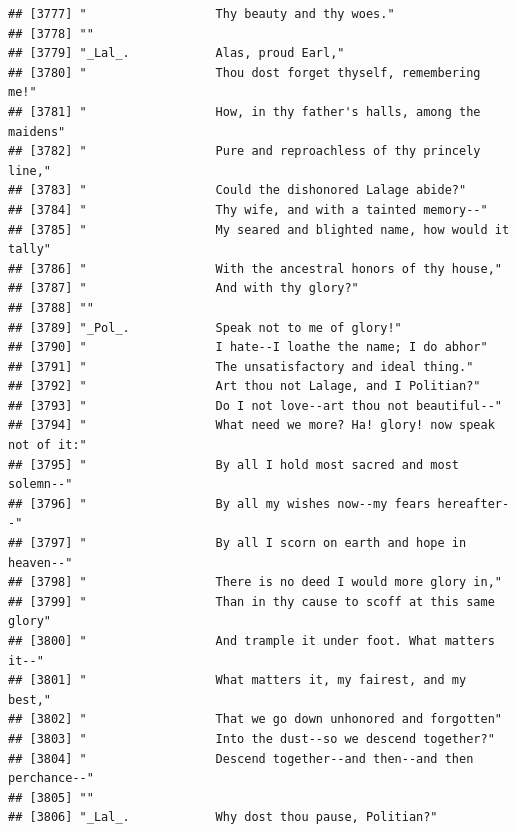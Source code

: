 \documentclass{article}\usepackage[]{graphicx}\usepackage[]{color}
\makeatletter
\newenvironment{kframe}{%
 \def\at@end@of@kframe{}%
 \ifinner\ifhmode%
  \def\at@end@of@kframe{\end{minipage}}%
  \begin{minipage}{\columnwidth}%
 \fi\fi%
 \def\FrameCommand##1{\hskip\@totalleftmargin \hskip-\fboxsep
 \colorbox{shadecolor}{##1}\hskip-\fboxsep
     \hskip-\linewidth \hskip-\@totalleftmargin \hskip\columnwidth}%
 \MakeFramed {\advance\hsize-\width
   \@totalleftmargin\z@ \linewidth\hsize
   \@setminipage}}%
 {\par\unskip\endMakeFramed%
 \at@end@of@kframe}
\newenvironment{knitrout}{}{} %
\makeatother
\begin{document}
\begin{knitrout}
\begin{kframe}
\begin{verbatim}
## [3777] "                  Thy beauty and thy woes."                                  
## [3778] ""                                                                            
## [3779] "_Lal_.            Alas, proud Earl,"                                         
## [3780] "                  Thou dost forget thyself, remembering me!"                 
## [3781] "                  How, in thy father's halls, among the maidens"             
## [3782] "                  Pure and reproachless of thy princely line,"               
## [3783] "                  Could the dishonored Lalage abide?"                        
## [3784] "                  Thy wife, and with a tainted memory--"                     
## [3785] "                  My seared and blighted name, how would it tally"           
## [3786] "                  With the ancestral honors of thy house,"                   
## [3787] "                  And with thy glory?"                                       
## [3788] ""                                                                            
## [3789] "_Pol_.            Speak not to me of glory!"                                 
## [3790] "                  I hate--I loathe the name; I do abhor"                     
## [3791] "                  The unsatisfactory and ideal thing."                       
## [3792] "                  Art thou not Lalage, and I Politian?"                      
## [3793] "                  Do I not love--art thou not beautiful--"                   
## [3794] "                  What need we more? Ha! glory! now speak not of it:"        
## [3795] "                  By all I hold most sacred and most solemn--"               
## [3796] "                  By all my wishes now--my fears hereafter--"                
## [3797] "                  By all I scorn on earth and hope in heaven--"              
## [3798] "                  There is no deed I would more glory in,"                   
## [3799] "                  Than in thy cause to scoff at this same glory"             
## [3800] "                  And trample it under foot. What matters it--"              
## [3801] "                  What matters it, my fairest, and my best,"                 
## [3802] "                  That we go down unhonored and forgotten"                   
## [3803] "                  Into the dust--so we descend together?"                    
## [3804] "                  Descend together--and then--and then perchance--"          
## [3805] ""                                                                            
## [3806] "_Lal_.            Why dost thou pause, Politian?"                            

\end{verbatim}
\end{kframe}
\end{knitrout}
\end{document}

